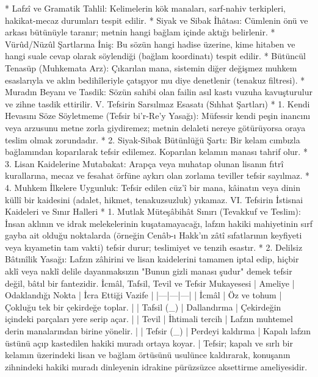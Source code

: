 \documentclass[11pt,a4paper]{article}
\begin{document}
 * Lafzî ve Gramatik Tahlil: Kelimelerin kök manaları, sarf-nahiv terkipleri, hakikat-mecaz durumları tespit edilir.
 * Siyak ve Sibak İhâtası: Cümlenin önü ve arkası bütünüyle taranır; metnin hangi bağlam içinde aktığı belirlenir.
 * Vürûd/Nüzûl Şartlarına İniş: Bu sözün hangi hadise üzerine, kime hitaben ve hangi suale cevap olarak söylendiği (bağlam koordinatı) tespit edilir.
 * Bütüncül Tenasüp (Muhkemata Arz): Çıkarılan mana, sistemin diğer değişmez muhkem esaslarıyla ve aklın bedihîleriyle çatışıyor mu diye denetlenir (tenakuz filtresi).
 * Muradın Beyanı ve Tasdik: Sözün sahibi olan failin asıl kastı vuzuha kavuşturulur ve zihne tasdik ettirilir.
V. Tefsirin Sarsılmaz Esasatı (Sıhhat Şartları)
 * 1. Kendi Hevasını Söze Söyletmeme (Tefsir bi'r-Re'y Yasağı):
   Müfessir kendi peşin inancını veya arzusunu metne zorla giydiremez; metnin delaleti nereye götürüyorsa oraya teslim olmak zorundadır.
 * 2. Siyak-Sibak Bütünlüğü Şartı:
   Bir kelam cımbızla bağlamından koparılarak tefsir edilemez. Koparılan kelamın manası tahrif olur.
 * 3. Lisan Kaidelerine Mutabakat:
   Arapça veya muhatap olunan lisanın fıtrî kurallarına, mecaz ve fesahat örfüne aykırı olan zorlama teviller tefsir sayılmaz.
 * 4. Muhkem İlkelere Uygunluk:
   Tefsir edilen cüz'î bir mana, kâinatın veya dinin küllî bir kaidesini (adalet, hikmet, tenakuzsuzluk) yıkamaz.
VI. Tefsirin İstisnai Kaideleri ve Sınır Halleri
 * 1. Mutlak Müteşâbihât Sınırı (Tevakkuf ve Teslim):
   İnsan aklının ve idrak melekelerinin kuşatamayacağı, lafzın hakiki mahiyetinin sırf gayba ait olduğu noktalarda (örneğin Cenâb-ı Hakk'ın zâtî sıfatlarının keyfiyeti veya kıyametin tam vakti) tefsir durur; teslimiyet ve tenzih esastır.
 * 2. Delilsiz Bâtınîlik Yasağı:
   Lafzın zâhirini ve lisan kaidelerini tamamen iptal edip, hiçbir aklî veya naklî delile dayanmaksızın "Bunun gizli manası şudur" demek tefsir değil, bâtıl bir fantezidir.
İcmâl, Tafsil, Tevil ve Tefsir Mukayesesi
| Ameliye | Odaklandığı Nokta | İcra Ettiği Vazife |
|---|---|---|
| İcmâl | Öz ve tohum | Çokluğu tek bir çekirdeğe toplar. |
| Tafsil (_{}) | Dallandırma | Çekirdeğin içindeki parçaları yere serip açar. |
| Tevil | İhtimali tercih | Lafzın muhtemel derin manalarından birine yönelir. |
| Tefsir (_{}) | Perdeyi kaldırma | Kapalı lafzın üstünü açıp kastedilen hakiki muradı ortaya koyar. |
Tefsir; kapalı ve sırlı bir kelamın üzerindeki lisan ve bağlam örtüsünü usulünce kaldırarak, konuşanın zihnindeki hakiki muradı dinleyenin idrakine pürüzsüzce aksettirme ameliyesidir.
\end{document}
